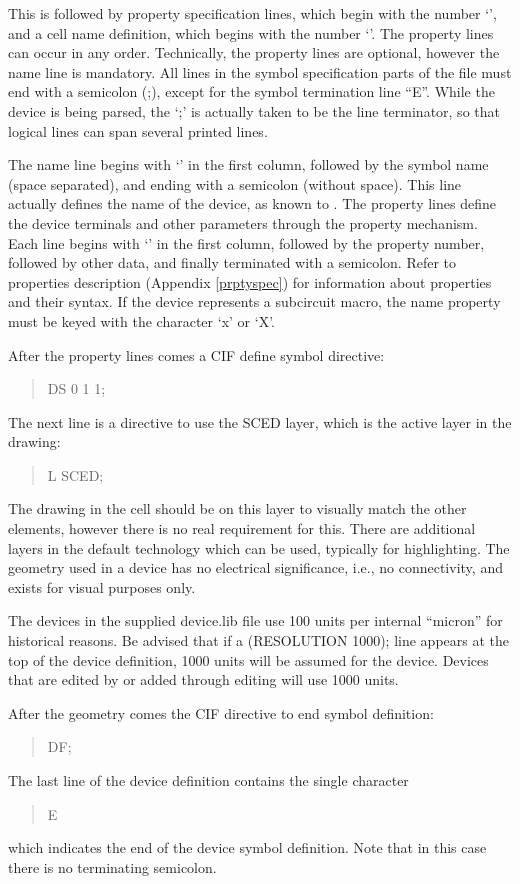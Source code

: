 This is followed by property specification lines, which begin with the
number `{}', and a cell name definition, which begins with the
number `{}'.  The property lines can occur in any order. 
Technically, the property lines are optional, however the name line is
mandatory.  All lines in the symbol specification parts of the file
must end with a semicolon (;), except for the symbol termination line
``{\vt E}''.  While the device is being parsed, the `;' is actually
taken to be the line terminator, so that logical lines can span
several printed lines.

The name line begins with `{}' in the first column, followed by
the symbol name (space separated), and ending with a semicolon
(without space).  This line actually defines the name of the device,
as known to {\Xic}.  The property lines define the device terminals
and other parameters through the property mechanism.  Each line begins
with `{}' in the first column, followed by the property number,
followed by other data, and finally terminated with a semicolon. 
Refer to properties description (Appendix \ref{prptyspec}) for
information about properties and their syntax.  If the device
represents a subcircuit macro, the name property must be keyed with
the character `{\vt x}' or `{\vt X}'.

After the property lines comes a CIF define symbol directive:
\begin{quote}
{\vt DS 0 1 1;}
\end{quote}
The next line is a directive to use the SCED layer, which is the
active layer in the drawing:
\begin{quote}
{\vt L SCED;}
\end{quote}
The drawing in the cell should be on this layer to visually match the
other elements, however there is no real requirement for this.  There
are additional layers in the default technology which can be used,
typically for highlighting.  The geometry used in a device has no
electrical significance, i.e., no connectivity, and exists for visual
purposes only.

The devices in the supplied {\vt device.lib} file use 100 units per
internal ``micron'' for historical reasons.  Be advised that if a {\vt
(RESOLUTION 1000);} line appears at the top of the device definition,
1000 units will be assumed for the device.  Devices that are edited by
{\Xic} or added through {\Xic} editing will use 1000 units.

After the geometry comes the CIF directive to end symbol definition:
\begin{quote}
{\vt DF;}
\end{quote}
The last line of the device definition contains the single character
\begin{quote}
{\vt E}
\end{quote}
which indicates the end of the device symbol definition.  Note that
in this case there is no terminating semicolon.

